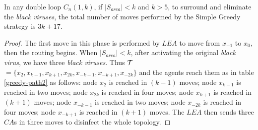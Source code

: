 \begin{theorem}
In any double loop  $C_n(1,k)$,  if $\left\vert{S_{area}}\right\vert < k$  and $k>5$, to surround and eliminate the {\it black viruses},
 the total number of moves performed by the Simple Greedy strategy is $3k+17$.
\end{theorem}
\begin{proof}
The first move in this phase is performed by $LEA$ to move from $x_{-1}$ to $x_0$, then the routing begins. When  $\left\vert{S_{area}}\right\vert < k$, after activating the original {\it black virus}, we  have three {\it black viruses}. Thus ${\cal T}$$=\{x_{2},x_{k-1},x_{k+1},x_{2k},x_{-k-1},x_{-k+1},x_{-2k}\}$ and the agents reach them as in table \ref{greedy-path2} as follows:
node $x_{2}$ is reached in $(k-1)$ moves;
node $x_{k-1}$ is reached in two moves;
node $x_{2k}$ is reached in four moves;
node $x_{k+1}$ is reached in $(k+1)$ moves;
node $x_{-k-1}$ is reached in two moves;
node $x_{-2k}$ is reached in four moves;
node $x_{-k+1}$ is reached in $(k+1)$ moves. The $LEA$ then sends three $CA$s in three moves to disinfect the whole topology.
\end{proof}
